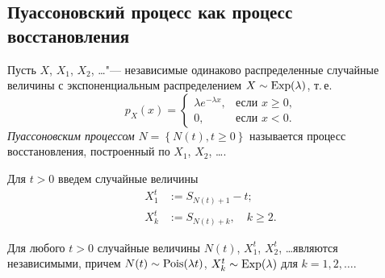 \subsection{Пуассоновский процесс как процесс восстановления}

\begin{df}
  \sloppy
  Пусть $X$, $X_1$, $X_2$, \ldots  "--- независимые одинаково распределенные случайные величины с экспоненциальным распределением $X\sim \operatorname{\mathrm Exp}(\lambda)$, т.\,е.
  \begin{equation*}
    p_X(x) =
    \begin{cases}
      \lambda e^{- \lambda x}, &\text{если $x \geqslant 0$,}\\
      0, &\text{если $x < 0$}.
    \end{cases}
  \end{equation*}
  \emph{Пуассоновским процессом} $N = \left\{N(t), t\geqslant 0\right\}$ называется процесс восстановления, построенный по $X_1$, $X_2$, \ldots.
\end{df}

Для $t > 0$ введем случайные величины
\begin{align*}
  X_1^t &:= S_{N(t) + 1} - t;\\
  X_k^t &:= S_{N(t) + k},\quad k \geqslant 2.
\end{align*}

\begin{lem}
  \sloppy
  Для любого $t > 0$ случайные величины $N(t)$, $X_1^t$, $X_2^t$, \ldots являются независимыми, причем $N(t) \sim \operatorname{\mathrm Pois}(\lambda t)$, $X_k^t \sim \operatorname{\mathrm Exp}(\lambda)$ для $k = 1, 2, \ldots$.
\end{lem}

